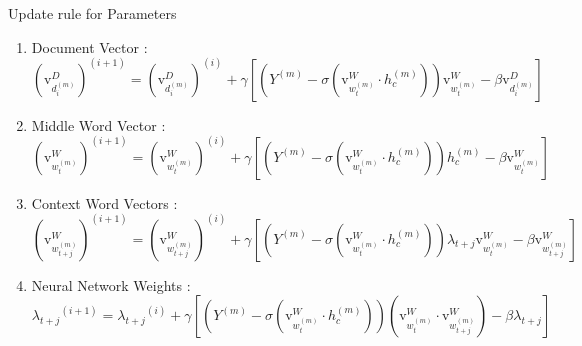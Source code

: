 \documentclass[10pt]{beamer}
\newcommand{\vecdi}[1]{\ensuremath{\mathrm{v}^{D}_{#1}}}
\newcommand{\vecwi}[1]{\ensuremath{\mathrm{v}^{W}_{#1}}}
\newcommand{\wgt}[1]{\ensuremath{\lambda_{#1}}}
\begin{document}
\begin{frame}{Update rule for Parameters}

\begin{enumerate}
	\vfill\item<1-> Document Vector : 
		\scriptsize{ \begin{equation}
				(\vecdi{d^{(m)}_{i}})^{(i+1)} = (\vecdi{d^{(m)}_{i}})^{(i)} + \gamma \left[ (Y^{(m)} - \sigma(\vecwi{w^{(m)}_{t}} \cdot h^{(m)}_{c}) )\vecwi{w^{(m)}_{t}} - \beta\vecdi{d^{(m)}_{i}} \right]
		\end{equation} }
	\vfill\item<1-> Middle Word Vector : 	
		\scriptsize{ \begin{equation}
			(\vecwi{w^{(m)}_{t}})^{(i+1)} = (\vecwi{w^{(m)}_{t}})^{(i)} + \gamma \left[ (Y^{(m)} - \sigma(\vecwi{w^{(m)}_{t}} \cdot h^{(m)}_{c})) h^{(m)}_{c} - \beta\vecwi{w^{(m)}_{t}} \right]
		\end{equation} }
	\vfill\item<1-> Context Word Vectors : 		
		\scriptsize{	\begin{equation}
			(\vecwi{w^{(m)}_{t+j}})^{(i+1)} = (\vecwi{w^{(m)}_{t+j}})^{(i)} + \gamma \left[(Y^{(m)} - \sigma(\vecwi{w^{(m)}_{t}} \cdot h^{(m)}_{c}))\wgt{t+j} \vecwi{w^{(m)}_{t}} - \beta\vecwi{w^{(m)}_{t+j}} \right]
		\end{equation} }
	\vfill\item<1-> Neural Network Weights : 		
		\scriptsize{	\begin{equation}
			\wgt{t+j}^{(i+1)} = \wgt{t+j}^{(i)} + \gamma \left[ (Y^{(m)} - \sigma(\vecwi{w^{(m)}_{t}} \cdot h^{(m)}_{c}))(\vecwi{w^{(m)}_{t}} \cdot \vecwi{w^{(m)}_{t+j}}) -\beta\wgt{t+j} \right]
		\end{equation} }
\end{enumerate}
\end{frame}

\end{document}
